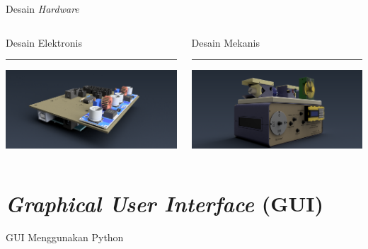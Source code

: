 \documentclass[10pt,xcolor={dvipsnames}]{beamer}
\begin{document}
		\begin{frame}{Desain \textit{Hardware}}
			\begin{columns}[T] %
				\begin{column}{0.48\textwidth}
					Desain Elektronis
					\color{black}\rule{\linewidth}{4pt}
					\includegraphics[width=7.5cm]{Render/Main Board_v3 (Home).png}
				\end{column}%
				\hfill%
				\begin{column}{0.48\textwidth}
					Desain Mekanis
					\color{blue}\rule{\linewidth}{4pt}
					\includegraphics[width=7.5cm]{Render/Feedback Actuator UNIT ES151(Home).png}
				\end{column}
			\end{columns}
		\end{frame}
		
\section{\textit{Graphical User Interface} (GUI)}
		\begin{frame}{GUI Menggunakan Python}
			\centering
	\end{frame}
	
\end{document}
